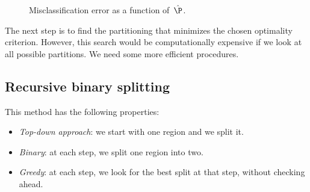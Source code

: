 \begin{figure}[ptb]
    \centering
    \caption{Misclassification error as a function of $\,\hat{\P}$.}
    \label{fig:misclassification}
\end{figure}

The next step is to find the partitioning that minimizes the chosen optimality criterion. However, this search would be computationally expensive if we look at all possible partitions. We need some more efficient procedures.

\subsection{Recursive binary splitting}

This method has the following properties:
\begin{itemize}
    \item \emph{Top-down approach}: we start with one region and we split it.
    \item \emph{Binary}: at each step, we split one region into two.
    \item \emph{Greedy}: at each step, we look for the best split at that step, without checking ahead.
\end{itemize}


